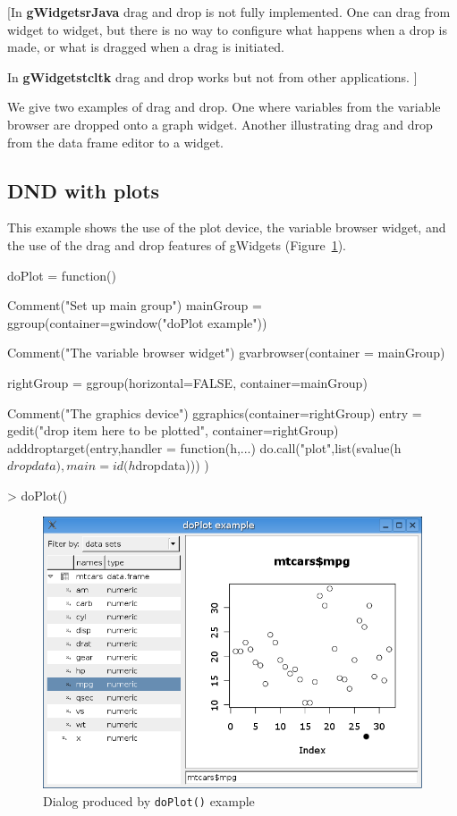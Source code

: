 \documentclass[12pt]{article}
\newcommand{\RFunc}[1]{\texttt{#1()}}
\newcommand{\RPackage}[1]{\textbf{#1}}
\begin{document}
[In \RPackage{gWidgetsrJava} drag and drop is not fully
implemented. One can drag from widget to widget, but there is no way
to configure what happens when a drop is made, or what is dragged when
a drag is initiated.

In \RPackage{gWidgetstcltk} drag and drop works but not from other
applications. 
]


We give two examples of drag and drop. One where variables from the
variable browser are dropped onto a graph widget. Another illustrating
drag and drop from the data frame editor to a widget.

\subsection{DND with plots}


This example shows the use of the plot device, the variable browser
widget, and the use of the drag and
drop features of gWidgets (Figure~\ref{fig:doPlot}).



\begin{Scode}
doPlot = function() {
  Comment("Set up main group")
  mainGroup = ggroup(container=gwindow("doPlot example"))
    
  Comment("The variable browser widget")
  gvarbrowser(container = mainGroup)

  rightGroup = ggroup(horizontal=FALSE, container=mainGroup)
    
  Comment("The graphics device")
  ggraphics(container=rightGroup)
  entry = gedit("drop item here to be plotted", container=rightGroup)
  adddroptarget(entry,handler = function(h,...) {
    do.call("plot",list(svalue(h$dropdata),main=id(h$dropdata)))
  })
}
\end{Scode}
\begin{Soutput}
> doPlot()
\end{Soutput}


\begin{figure}[htbp]
  \centering
  \includegraphics[width=.6\textwidth]{doPlot}
  \caption{Dialog produced by \RFunc{doPlot} example}
  \label{fig:doPlot}
\end{figure}
\end{document}
